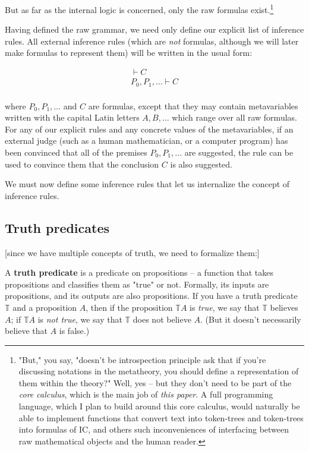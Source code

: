 \documentclass{article}
\begin{document}
  But as far as the internal logic is concerned, only the raw formulas exist.\footnote{"But," you say, "doesn't be introspection principle ask that if you're discussing notations in the metatheory, you should define a representation of them within the theory?" Well, yes – but they don't need to be part of the \emph{core calculus}, which is the main job of \emph{this paper}. A full programming language, which I plan to build around this core calculus, would naturally be able to implement functions that convert text into token-trees and token-trees into formulas of IC, and others such inconveniences of interfacing between raw mathematical objects and the human reader.}
  
  Having defined the raw grammar, we need only define our explicit list of inference rules. 
  All external inference rules (which are \emph{not} formulas, although we will later make formulas to represent them) will be written in the usual form:
  
  \begin{align*}
    \vdash C\\
    P_0, P_1, \dots \vdash C\\
  \end{align*}
  
  where $P_0, P_1, \dots$ and $C$ are formulas, except that they may contain metavariables written with the capital Latin letters $A, B, \dots$ which range over all raw formulas. For any of our explicit rules and any concrete values of the metavariables, if an external judge (such as a human mathematician, or a computer program) has been convinced that all of the premises $P_0, P_1, \dots$ are suggested, the rule can be used to convince them that the conclusion $C$ is also suggested.
  
  We must now define some inference rules that let us internalize the concept of inference rules.


  \iffalse

  \subsection{Truth predicates}
  
  [since we have multiple concepts of truth, we need to formalize them:]
  
  A \textbf{truth predicate} is a predicate on propositions – a function that takes propositions and classifies them as "true" or not. Formally, its inputs are propositions, and its outputs are also propositions. If you have a truth predicate $\mathbb{T}$ and a proposition $A$, then if the proposition $\mathbb{T} A$ is \emph{true}, we say that $\mathbb{T}$ believes $A$; if $\mathbb{T} A$ is \emph{not true}, we say that $\mathbb{T}$ does not believe $A$. (But it doesn't necessarily believe that $A$ is false.)
  
\end{document}
